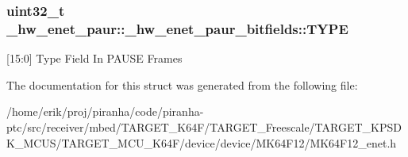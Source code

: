 \subsubsection[{\texorpdfstring{T\+Y\+PE}{TYPE}}]{\setlength{\rightskip}{0pt plus 5cm}uint32\+\_\+t \+\_\+hw\+\_\+enet\+\_\+paur\+::\+\_\+hw\+\_\+enet\+\_\+paur\+\_\+bitfields\+::\+T\+Y\+PE}\hypertarget{struct__hw__enet__paur_1_1__hw__enet__paur__bitfields_a1f761e716bc479dc639158dbe796a9a4}{}\label{struct__hw__enet__paur_1_1__hw__enet__paur__bitfields_a1f761e716bc479dc639158dbe796a9a4}
\mbox{[}15\+:0\mbox{]} Type Field In P\+A\+U\+SE Frames 

The documentation for this struct was generated from the following file\+:\begin{DoxyCompactItemize}
\item 
/home/erik/proj/piranha/code/piranha-\/ptc/src/receiver/mbed/\+T\+A\+R\+G\+E\+T\+\_\+\+K64\+F/\+T\+A\+R\+G\+E\+T\+\_\+\+Freescale/\+T\+A\+R\+G\+E\+T\+\_\+\+K\+P\+S\+D\+K\+\_\+\+M\+C\+U\+S/\+T\+A\+R\+G\+E\+T\+\_\+\+M\+C\+U\+\_\+\+K64\+F/device/device/\+M\+K64\+F12/M\+K64\+F12\+\_\+enet.\+h\end{DoxyCompactItemize}
